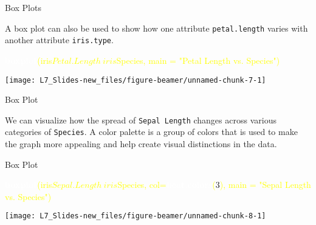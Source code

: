 \documentclass[ignorenonframetext,]{beamer}
\newenvironment{Shaded}{\begin{snugshade}}{\end{snugshade}}
\newcommand{\KeywordTok}[1]{\textcolor{white}{\textbf{{#1}}}}
\newcommand{\NormalTok}[1]{\textcolor{yellow}{{#1}}}
\newcommand{\DataTypeTok}[1]{\textcolor{yellow}{{#1}}}
\newcommand{\DecValTok}[1]{\textcolor{numbercolor}{{#1}}}
\newcommand{\StringTok}[1]{\textcolor{yellow}{{#1}}}
\begin{document}
\begin{frame}[fragile]{Box Plots}

A box plot can also be used to show how one attribute
\texttt{petal.length} varies with another attribute \texttt{iris.type}.

\small

\begin{Shaded}
\begin{Highlighting}[]
\KeywordTok{boxplot}\NormalTok{(iris$Petal.Length~iris$Species, }
        \DataTypeTok{main =} \StringTok{"Petal Length vs. Species"}\NormalTok{) }
\end{Highlighting}
\end{Shaded}

\begin{center}\texttt{[image: L7\_Slides-new\_files/figure-beamer/unnamed-chunk-7-1]} \end{center}

\end{frame}

\begin{frame}[fragile]{Box Plot}

We can visualize how the spread of \texttt{Sepal\ Length} changes across
various categories of \texttt{Species}. A color palette is a group of
colors that is used to make the graph more appealing and help create
visual distinctions in the data.

\end{frame}

\begin{frame}[fragile]{Box Plot}

\small

\begin{Shaded}
\begin{Highlighting}[]
\KeywordTok{boxplot}\NormalTok{(iris$Sepal.Length~iris$Species,}
        \DataTypeTok{col=}\KeywordTok{heat.colors}\NormalTok{(}\DecValTok{3}\NormalTok{), }
        \DataTypeTok{main =} \StringTok{"Sepal Length vs. Species"}\NormalTok{)}
\end{Highlighting}
\end{Shaded}

\begin{center}\texttt{[image: L7\_Slides-new\_files/figure-beamer/unnamed-chunk-8-1]} \end{center}

\end{frame}
\end{document}
